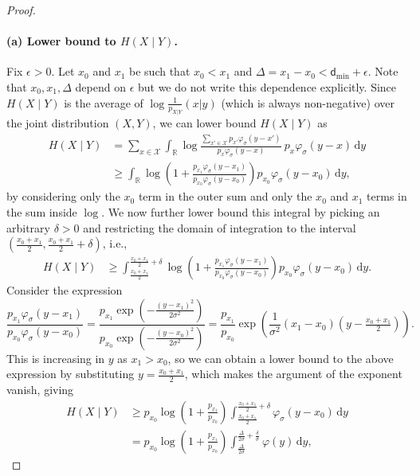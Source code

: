\documentclass[11pt]{article}
\newcommand{\calX}{\mathcal{X}}
\newcommand{\bbR}{\mathbb{R}}
\newcommand{\intR}{\int_{\bbR}}
\renewcommand{\d}{\,\mathrm{d}}
\newcommand{\dmin}{\mathsf{d}_{\min}}
\begin{document}
\begin{proof}[Proof]
		\paragraph{(a) Lower bound to $H(X \mid Y)$. } 
		Fix $\epsilon > 0$. 
		Let $x_0$ and $x_1$ be such that $x_0 < x_1$ and $\Delta = x_1 - x_0 < \dmin + \epsilon$. Note that $x_0,x_1,\Delta$ depend on $\epsilon$ but we do not write this dependence explicitly. Since $H(X \mid Y)$ is the average of $\log\frac1{p_{X|Y}}(x|y)$ (which is always non-negative) over the joint distribution $(X,Y)$, we can lower bound $H(X \mid Y)$ as
		\begin{align*}
			H(X \mid Y) &= \sum_{x \in \calX}  \intR \log \frac{\sum_{x' \in \calX} p_{x'} \varphi_{\sigma}(y-x')}{p_{x} \varphi_{\sigma}(y - x)}\ p_{x}\varphi_{\sigma}(y-x) \d y\\
			&\geq  \intR \log \left(1+\frac{ p_{x_1} \varphi_{\sigma}(y-x_1)}{p_{x_0} \varphi_{\sigma}(y - x_0)}\right) p_{x_0}\varphi_{\sigma}(y-x_0) \d y,
		\end{align*}
		by considering only the $x_0$ term in the outer sum and only the $x_0$ and $x_1$ terms in the sum inside $\log$. 
		We now further lower bound this integral by picking an arbitrary $\delta > 0$ and restricting the domain of integration to the interval $(\frac{x_0 + x_1}{2}, \frac{x_0 + x_1}{2}+\delta)$, i.e.,
		\begin{align*}
			H(X \mid Y) &\geq  \int_{\frac{x_0 + x_1}{2}}^{\frac{x_0 + x_1}{2}+\delta} \log \left(1+\frac{ p_{x_1} \varphi_{\sigma}(y-x_1)}{p_{x_0} \varphi_{\sigma}(y - x_0)}\right) p_{x_0}\varphi_{\sigma}(y-x_0) \d y.
		\end{align*}
		Consider the expression $$\frac{ p_{x_1} \varphi_{\sigma}(y-x_1)}{p_{x_0} \varphi_{\sigma}(y - x_0)} = \frac{ p_{x_1} \exp(-\frac{(y-x_1)^2}{2\sigma^2})}{p_{x_0} \exp(-\frac{(y-x_0)^2}{2\sigma^2})} = \frac{p_{x_1}}{p_{x_0}}\exp\left(\frac{1}{\sigma^2}(x_1-x_0)(y - \tfrac{x_0 + x_1}{2})\right).$$
		This is increasing in $y$ as $x_1 > x_0$, so we can obtain a lower bound to the above expression by substituting $y = \frac{x_0 + x_1}{2}$, which makes the argument of the exponent vanish, giving 
		\begin{align*}
			H(X \mid Y) &\geq p_{x_0}\log \left(1+\tfrac{p_{x_1}}{p_{x_0}} \right) \int_{\frac{x_0 + x_1}{2}}^{\frac{x_0 + x_1}{2}+\delta}  \varphi_{\sigma}(y-x_0) \d y \\
			&= p_{x_0}\log \left(1+\tfrac{p_{x_1}}{p_{x_0}} \right) \int_{\frac{\Delta}{2\sigma}}^{\frac{\Delta}{2\sigma} + \frac{\delta}{\sigma}}  \varphi(y) \d y,

\end{align*}
\end{proof}
\end{document}
